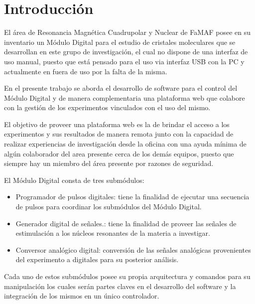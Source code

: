 \section{Introducci\'on}

El \'area de Resonancia Magn\'etica Cuadrupolar
y Nuclear de FaMAF posee en su inventario un M\'odulo Digital
para el estudio de cristales moleculares que se desarrollan 
en este grupo de investigaci\'on, el cual no dispone de una 
interfaz de uso manual, puesto que est\'a pensado para el 
uso via interfaz USB con la PC y actualmente en fuera 
de uso por la falta de la misma.

En el presente trabajo se aborda el desarrollo de software para
el control del M\'odulo Digital y de manera complementaria una
plataforma web que colabore con la gesti\'on de los experimentos 
vinculados con el uso del mismo.

El objetivo de proveer una plataforma web es la de brindar el acceso 
a los experimentos y sus resultados de manera remota junto con 
la capacidad de realizar experiencias de investigaci\'on desde la oficina
con una ayuda m\'inima de alg\'un colaborador del area presente cerca
de los dem\'as equipos, puesto que siempre hay un miembro del \'area presente
por razones de seguridad.

El Módulo Digital consta de tres submódulos:

\begin{itemize}

   \item Programador de pulsos digitales: tiene la finalidad 
   de ejecutar una secuencia de pulsos para coordinar los 
   subm\'odulos del M\'odulo Digital.

   \item Generador digital de se\~nales.: tiene la finalidad 
   de proveer las se\~nales de estimulaci\'on a los n\'ucleos 
   resonantes de la materia a investigar.

   \item Conversor anal\'ogico digital: conversi\'on de las 
   se\~nales anal\'ogicas provenientes del experimento a 
   digitales para su posterior an\'alisis.

\end{itemize}

Cada uno de estos subm\'odulos posee su propia arquitectura y comandos 
para su manipulaci\'on los cuales ser\'an partes claves en el desarrollo del 
software y la integraci\'on de los mismos en un \'unico controlador.

